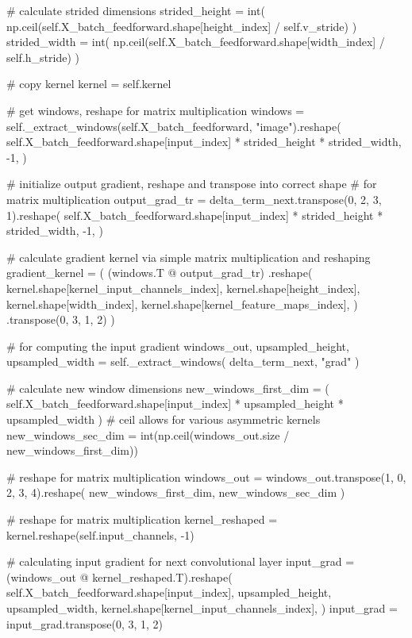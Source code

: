 \documentclass[%
oneside,                 %
final,                   %
10pt]{article}
\begin{document}
        # calculate strided dimensions
        strided_height = int(
            np.ceil(self.X_batch_feedforward.shape[height_index] / self.v_stride)
        )
        strided_width = int(
            np.ceil(self.X_batch_feedforward.shape[width_index] / self.h_stride)
        )

        # copy kernel
        kernel = self.kernel

        # get windows, reshape for matrix multiplication
        windows = self._extract_windows(self.X_batch_feedforward, "image").reshape(
            self.X_batch_feedforward.shape[input_index]
            * strided_height
            * strided_width,
            -1,
        )

        # initialize output gradient, reshape and transpose into correct shape
        # for matrix multiplication
        output_grad_tr = delta_term_next.transpose(0, 2, 3, 1).reshape(
            self.X_batch_feedforward.shape[input_index]
            * strided_height
            * strided_width,
            -1,
        )

        # calculate gradient kernel via simple matrix multiplication and reshaping
        gradient_kernel = (
            (windows.T @ output_grad_tr)
            .reshape(
                kernel.shape[kernel_input_channels_index],
                kernel.shape[height_index],
                kernel.shape[width_index],
                kernel.shape[kernel_feature_maps_index],
            )
            .transpose(0, 3, 1, 2)
        )

        # for computing the input gradient
        windows_out, upsampled_height, upsampled_width = self._extract_windows(
            delta_term_next, "grad"
        )

        # calculate new window dimensions
        new_windows_first_dim = (
            self.X_batch_feedforward.shape[input_index]
            * upsampled_height
            * upsampled_width
        )
        # ceil allows for various asymmetric kernels
        new_windows_sec_dim = int(np.ceil(windows_out.size / new_windows_first_dim))

        # reshape for matrix multiplication
        windows_out = windows_out.transpose(1, 0, 2, 3, 4).reshape(
            new_windows_first_dim, new_windows_sec_dim
        )

        # reshape for matrix multiplication
        kernel_reshaped = kernel.reshape(self.input_channels, -1)

        # calculating input gradient for next convolutional layer
        input_grad = (windows_out @ kernel_reshaped.T).reshape(
            self.X_batch_feedforward.shape[input_index],
            upsampled_height,
            upsampled_width,
            kernel.shape[kernel_input_channels_index],
        )
        input_grad = input_grad.transpose(0, 3, 1, 2)
\end{document}
